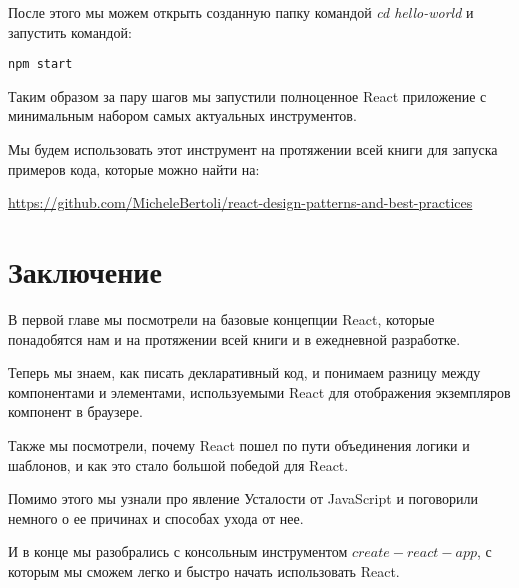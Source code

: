 После этого мы можем открыть созданную папку командой \textit{cd hello-world} и запустить командой:

\begin{lstlisting}
npm start
\end{lstlisting}

Таким образом за пару шагов мы запустили полноценное React приложение с минимальным набором самых актуальных инструментов.

Мы будем использовать этот инструмент на протяжении всей книги для запуска примеров кода, которые можно найти на:

\href{https://github.com/MicheleBertoli/react-design-patterns-and-best-practices}{https://github.com/MicheleBertoli/react-design-patterns-and-best-practices}

\section{Заключение}

В первой главе мы посмотрели на базовые концепции React, которые понадобятся нам и на протяжении всей книги и в ежедневной разработке.

Теперь мы знаем, как писать декларативный код, и понимаем разницу между компонентами и элементами, используемыми React для отображения экземпляров компонент в браузере.

Также мы посмотрели, почему React пошел по пути объединения логики и шаблонов, и как это стало большой победой для React.

Помимо этого мы узнали про явление Усталости от JavaScript и поговорили немного о ее причинах и способах ухода от нее.

И в конце мы разобрались с консольным инструментом $create-react-app$, с которым мы сможем легко и быстро начать использовать React.




